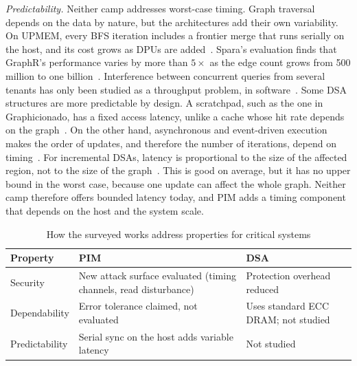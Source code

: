 \documentclass[journal,onecolumn]{IEEEtran}
\begin{document}
\emph{Predictability.} Neither camp addresses worst-case timing. Graph traversal depends on the data by nature, but the architectures add their own variability. On UPMEM, every BFS iteration includes a frontier merge that runs serially on the host, and its cost grows as DPUs are added~\cite{gomezluna2022prim}. Spara's evaluation finds that GraphR's performance varies by more than $5\times$ as the edge count grows from 500 million to one billion~\cite{zheng2020spara}. Interference between concurrent queries from several tenants has only been studied as a throughput problem, in software~\cite{yin2023glign}. Some DSA structures are more predictable by design. A scratchpad, such as the one in Graphicionado, has a fixed access latency, unlike a cache whose hit rate depends on the graph~\cite{ham2016graphicionado}. On the other hand, asynchronous and event-driven execution makes the order of updates, and therefore the number of iterations, depend on timing~\cite{rahman2021jetstream,zhuo2019graphq}. For incremental DSAs, latency is proportional to the size of the affected region, not to the size of the graph~\cite{rahman2021jetstream,zhao2022tdgraph}. This is good on average, but it has no upper bound in the worst case, because one update can affect the whole graph. Neither camp therefore offers bounded latency today, and PIM adds a timing component that depends on the host and the system scale.

\begin{table}[t]
\caption{How the surveyed works address properties for critical systems}
\label{tab:critical}
\centering\footnotesize
\begin{tabularx}{\columnwidth}{@{}L{2.6cm}YY@{}}
\toprule
Property & PIM & DSA \\
\midrule
Security & New attack surface evaluated (timing channels, read disturbance)~\cite{bostanci2025impact,yuksel2026pid} & Protection overhead reduced~\cite{hua2022mgx} \\
Dependability & Error tolerance claimed, not evaluated~\cite{song2018graphr} & Uses standard ECC DRAM; not studied \\
Predictability & Serial sync on the host adds variable latency~\cite{gomezluna2022prim} & Not studied \\
\bottomrule
\end{tabularx}
\end{table}

\end{document}
